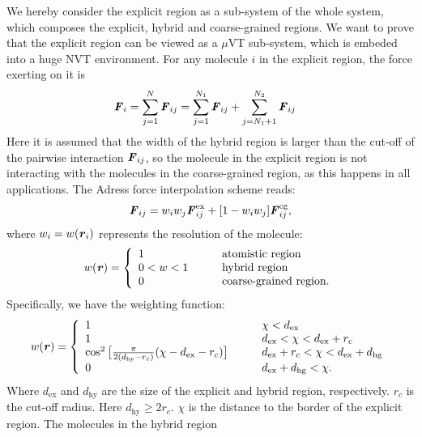 \documentclass[aps,pre,preprint]{revtex4}
\renewcommand{\v}[1]{\textbf{\textit{#1}}}
\begin{document}
We hereby consider the explicit region as a sub-system of the whole
system, which composes the explicit, hybrid and coarse-grained
regions. We want to prove that the explicit region can be viewed as a
$\mu$VT sub-system, which is embeded into a huge NVT environment.
For any molecule $i$ in the explicit region, the force exerting on
it is
\begin{align}
  \v F_i &= \sum_{j=1}^{N}\v F_{ij} 
  =
  \sum_{j=1}^{N_1}\v F_{ij} + \sum_{j=N_1+1}^{N_2}\v F_{ij} 
\end{align}
Here it is assumed that the width of the hybrid region is larger than
the cut-off of the pairwise interaction $\v F_{ij}$, so the molecule
in the explicit region is not interacting with the molecules in the
coarse-grained region, as this happens in all applications.
The Adress force interpolation scheme reads:
\begin{align}\label{eqn:f-interp}
  \v F_{ij} = w_iw_j\v F^{\textrm{ex}}_{ij} + [1-w_iw_j]\v F^{\textrm{cg}}_{ij},
\end{align}
where $w_i = w(\v r_i)$ represents
the resolution of the molecule:
\begin{align}\label{eqn:w1}
  w(\v r) =
  \left\{
    \begin{array}{lcl}
      1 &\quad& \textrm{atomistic region}\\
      0<w<1  && \textrm{hybrid region}\\
      0 && \textrm{coarse-grained region}.
    \end{array}
  \right.
\end{align}
Specifically, we have the weighting function:
\begin{align}\label{eqn:w2}
  w(\v r) =
  \left\{
    \begin{array}{lcl}
      1 &\quad& \chi < d_{\textrm{ex}}\\
      1  && d_{\textrm{ex}} < \chi < d_{\textrm{ex}} + r_c\\
      \cos^2\big[\frac{\pi}{2(d_{\textrm{hy}} - r_c)} (\chi - d_{\textrm{ex}} - r_c)\big] && d_{\textrm{ex}} + r_c < \chi < d_{\textrm{ex}} + d_{\textrm{hg}} \\
      0 && d_{\textrm{ex}} + d_{\textrm{hg}}  < \chi.
    \end{array}
  \right.
\end{align}
Where $d_{\textrm{ex}}$ and $d_{\textrm{hy}}$ are the size of the
explicit and hybrid region, respectively. $r_c$ is the cut-off
radius. Here $d_{\textrm{hy}} \geq 2r_c$. $\chi$ is the distance to
the border of the explicit region.  The molecules in the hybrid region
\end{document}
